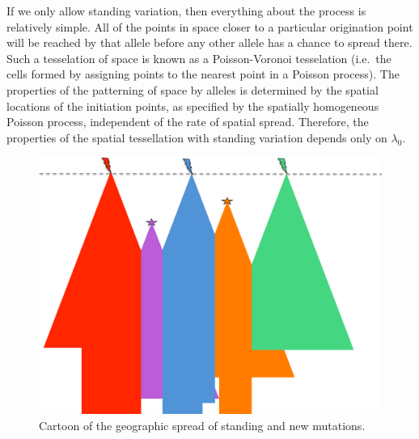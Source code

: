 \documentclass{article}
\begin{document}
If we only allow standing variation, then everything about the process is relatively simple. 
All of the points in space closer to a particular origination point will be
reached by that allele before any other allele has a chance to spread there. 
Such a tesselation of space is known as a Poisson-Voronoi tesselation \citep{poissonvoronoi}
(i.e.\ the cells formed by assigning points to the nearest point in a Poisson process).
The properties of the patterning of space by alleles is
determined by the spatial locations of the initiation points, 
as specified by the spatially homogeneous Poisson process, 
independent of the rate of spatial spread. 
Therefore, the properties of the spatial tessellation with standing variation depends only on $\lambda_0$.


\begin{figure}[ht]
  \begin{center}
    \includegraphics{spreading_alleles_trimmed}
  \end{center}
  \caption{
Cartoon of the geographic spread of standing and new mutations. 
}
  \label{fig:cartoon}
  
\end{figure}


\end{document}
